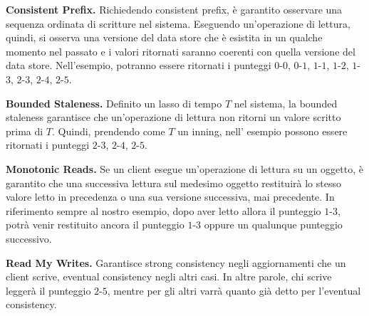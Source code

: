 \documentclass[twoside]{article}
\begin{document}
\begin{multicols}{2}
\textbf{Consistent Prefix.} Richiedendo consistent prefix, è garantito osservare una sequenza ordinata di scritture nel sistema. Eseguendo un'operazione di lettura, quindi, si osserva una versione del data store che è esistita in un qualche momento nel passato e i valori ritornati saranno coerenti con quella versione del data store. Nell'esempio, potranno essere ritornati i punteggi $0$-$0$, $0$-$1$, $1$-$1$, $1$-$2$, $1$-$3$, $2$-$3$, $2$-$4$, $2$-$5$.

\textbf{Bounded Staleness.} Definito un lasso di tempo $T$ nel sistema, la bounded staleness garantisce che un'operazione di lettura non ritorni un valore scritto prima di $T$. Quindi, prendendo come $T$ un inning, nell' esempio possono essere ritornati i punteggi $2$-$3$, $2$-$4$, $2$-$5$.

\textbf{Monotonic Reads.} Se un client esegue un'operazione di lettura su un oggetto, è garantito che una successiva lettura sul medesimo oggetto restituirà lo stesso valore letto in precedenza o una sua versione successiva, mai precedente. In riferimento sempre al nostro esempio, dopo aver letto allora il punteggio $1$-$3$, potrà venir restituito ancora il punteggio $1$-$3$ oppure un qualunque punteggio successivo.

\textbf{Read My Writes.} Garantisce strong consistency negli aggiornamenti che un client scrive, eventual consistency negli altri casi. In altre parole, chi scrive leggerà il punteggio $2$-$5$, mentre per gli altri varrà quanto già detto per l'eventual consistency.


\end{multicols}
\end{document}

